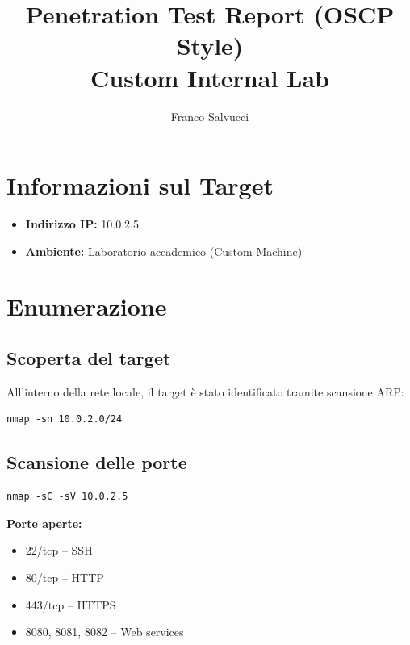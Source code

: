 \documentclass[a4paper,11pt]{article}
\title{\textbf{Penetration Test Report (OSCP Style)}\\Custom Internal Lab}
\author{Franco Salvucci}
\date{}
\begin{document}
\maketitle
\tableofcontents
\newpage

\section{Informazioni sul Target}

\begin{itemize}
    \item \textbf{Indirizzo IP:} 10.0.2.5
    \item \textbf{Ambiente:} Laboratorio accademico (Custom Machine)
\end{itemize}

\section{Enumerazione}

\subsection{Scoperta del target}

All’interno della rete locale, il target è stato identificato tramite scansione ARP:

\begin{lstlisting}
nmap -sn 10.0.2.0/24
\end{lstlisting}

\subsection{Scansione delle porte}

\begin{lstlisting}
nmap -sC -sV 10.0.2.5
\end{lstlisting}

\textbf{Porte aperte:}

\begin{itemize}
    \item 22/tcp – SSH
    \item 80/tcp – HTTP
    \item 443/tcp – HTTPS
    \item 8080, 8081, 8082 – Web services
\end{itemize}

\end{document}
